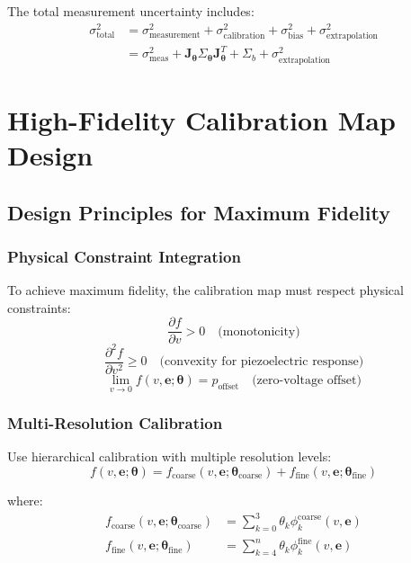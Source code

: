 \documentclass[11pt]{article}
\begin{document}
The total measurement uncertainty includes:
\begin{align}
\sigma_{\text{total}}^2 &= \sigma_{\text{measurement}}^2 + \sigma_{\text{calibration}}^2 + \sigma_{\text{bias}}^2 + \sigma_{\text{extrapolation}}^2 \\
&= \sigma_{\text{meas}}^2 + \mathbf{J}_{\bm{\theta}} \Sigma_{\bm{\theta}} \mathbf{J}_{\bm{\theta}}^T + \Sigma_{b} + \sigma_{\text{extrapolation}}^2
\end{align}

\section{High-Fidelity Calibration Map Design}

\subsection{Design Principles for Maximum Fidelity}

\subsubsection{Physical Constraint Integration}
To achieve maximum fidelity, the calibration map must respect physical constraints:
\begin{equation}
\frac{\partial f}{\partial v} > 0 \quad \text{(monotonicity)}
\end{equation}
\begin{equation}
\frac{\partial^2 f}{\partial v^2} \geq 0 \quad \text{(convexity for piezoelectric response)}
\end{equation}
\begin{equation}
\lim_{v \to 0} f(v, \mathbf{e}; \bm{\theta}) = p_{\text{offset}} \quad \text{(zero-voltage offset)}
\end{equation}

\subsubsection{Multi-Resolution Calibration}
Use hierarchical calibration with multiple resolution levels:
\begin{equation}
f(v, \mathbf{e}; \bm{\theta}) = f_{\text{coarse}}(v, \mathbf{e}; \bm{\theta}_{\text{coarse}}) + f_{\text{fine}}(v, \mathbf{e}; \bm{\theta}_{\text{fine}})
\end{equation}

where:
\begin{align}
f_{\text{coarse}}(v, \mathbf{e}; \bm{\theta}_{\text{coarse}}) &= \sum_{k=0}^{3} \theta_k \phi_k^{\text{coarse}}(v, \mathbf{e}) \\
f_{\text{fine}}(v, \mathbf{e}; \bm{\theta}_{\text{fine}}) &= \sum_{k=4}^{n} \theta_k \phi_k^{\text{fine}}(v, \mathbf{e})
\end{align}
\end{document}
